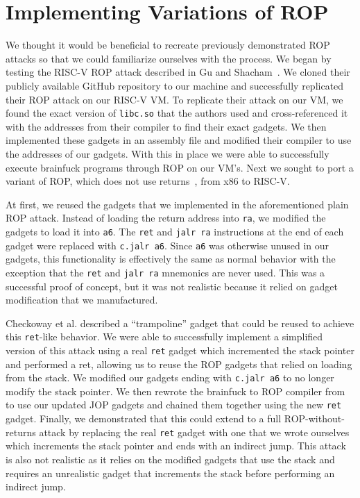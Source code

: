 \section{Implementing Variations of ROP}

We thought it would be beneficial to recreate previously demonstrated ROP attacks
so that we could familiarize ourselves with the process. We began by testing the
RISC-V ROP attack described in Gu and Shacham~\cite{gu20ropriscv}. We cloned
their publicly available GitHub repository to our machine and successfully
replicated their ROP attack on our RISC-V VM. To replicate their attack on our VM, we
found the exact version of \verb|libc.so| that the authors used and cross-referenced
it with the addresses from their compiler to find their exact gadgets. We then
implemented these gadgets in an assembly file and modified their compiler to use
the addresses of our gadgets. With this in place we were able to successfully execute
brainfuck programs through ROP on our VM's. Next we sought to port a variant of
ROP, which does not use returns~\cite{checkoway10ropnoret}, from x86 to RISC-V.

At first, we reused the gadgets that we implemented in the aforementioned plain ROP
attack. Instead of loading the return address into \verb|ra|, we modified the
gadgets to load it into \verb|a6|. The \verb|ret| and \verb|jalr ra|
instructions at the end of each gadget were replaced with \verb|c.jalr a6|.
Since \verb|a6| was otherwise unused in our gadgets, this functionality is
effectively the same as normal behavior with the exception that the \verb|ret|
and \verb|jalr ra| mnemonics are never used. This was a successful proof of
concept, but it was not realistic because it relied on gadget modification that
we manufactured.

Checkoway et al. described a ``trampoline'' gadget that could be reused to
achieve this \verb|ret|-like behavior. We were able to successfully implement
a simplified version of this attack using a real \verb|ret| gadget which incremented
the stack pointer and performed a ret, allowing us to reuse the ROP gadgets that 
relied on loading from the stack. We modified our gadgets ending with \verb|c.jalr a6|
to no longer modify the stack pointer. We then rewrote the brainfuck to ROP compiler
from \cite{gu20ropriscv} to use our updated JOP gadgets and chained them together
using the new \verb|ret| gadget. Finally, we demonstrated that this could extend to a
full ROP-without-returns attack by replacing the real \verb|ret| gadget with one
that we wrote ourselves which increments the stack pointer and ends with an indirect jump.
This attack is also not realistic as it relies on the modified gadgets that use the stack
and requires an unrealistic gadget that increments the stack before performing an indirect jump.

